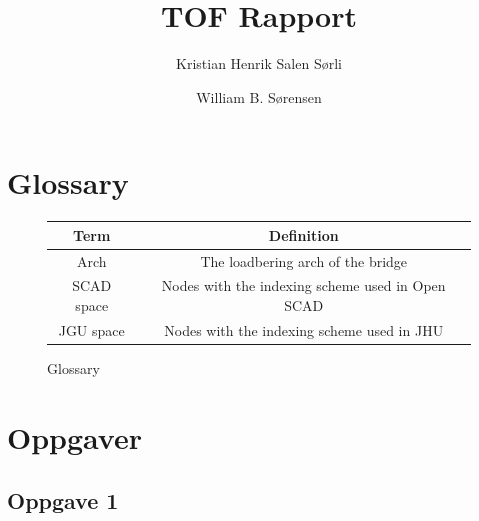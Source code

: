 \documentclass{report}
\author{
  Kristian Henrik Salen Sørli
  \and
  William B. Sørensen\\
}
\title{TOF Rapport}
\begin{document}
\maketitle

\tableofcontents

\chapter{Glossary}

\begin{figure}[H]
	\centering
	\begin{tabular}{c|c}
		Term       & Definition                                       \\
		\hline
		Arch       & The loadbering arch of the bridge                \\
		SCAD space & Nodes with the indexing scheme used in Open SCAD \\
		JGU space  & Nodes with the indexing scheme used in JHU       \\
	\end{tabular}
	\caption{Glossary}
\end{figure}

\chapter{Oppgaver}






\section{Oppgave 1}
\end{document}
